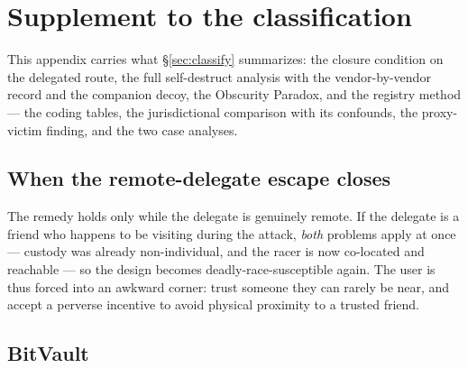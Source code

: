 \section{Supplement to the classification}
\label{app:classify}

\noindent This appendix carries what \S\ref{sec:classify} summarizes: the
closure condition on the delegated route, the full self-destruct analysis with
the vendor-by-vendor record and the companion decoy, the Obscurity Paradox, and
the registry method --- the coding tables, the jurisdictional comparison with its
confounds, the proxy-victim finding, and the two case analyses.

\subsection{When the remote-delegate escape closes}
\label{app:classify-escape}

\begin{remark}\label{rem:escape-closes}
The remedy holds only while the delegate is genuinely remote. If the delegate is
a friend who happens to be visiting during the attack, \emph{both} problems
apply at once --- custody was already non-individual, and the racer is now
co-located and reachable --- so the design becomes deadly-race-susceptible
again. The user is thus forced into an awkward corner: trust someone they can
rarely be near, and accept a perverse incentive to avoid physical proximity to a
trusted friend.
\end{remark}

\subsection{BitVault}
\label{app:classify-bitvault}

